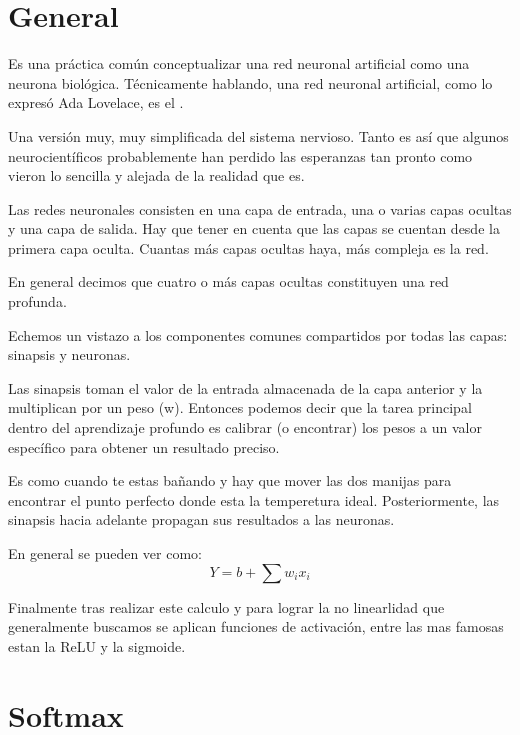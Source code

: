 \documentclass[12pt, fleqn]{report}                             %
\newcommand \Quote              {\qq}                           %
\theoremstyle{break}                                            %
\begin{document}
        \section{General}

        Es una práctica común conceptualizar una red neuronal artificial como una neurona biológica. 
        Técnicamente hablando, una red neuronal artificial, como lo expresó Ada Lovelace, 
        es el \Quote{cálculo del sistema nervioso}. 
        
        Una versión muy, muy simplificada del sistema nervioso. Tanto es así que algunos neurocientíficos 
        probablemente han perdido las esperanzas tan pronto como vieron lo sencilla y alejada de la realidad que es.

        Las redes neuronales consisten en una capa de entrada, una o varias capas ocultas y una capa de salida. 
        Hay que tener en cuenta que las capas se cuentan desde la primera capa oculta. 
        Cuantas más capas ocultas haya, más compleja es la red. 
        
        En general decimos que cuatro o más capas ocultas constituyen una red profunda. 

        Echemos un vistazo a los componentes comunes compartidos por todas las capas: sinapsis y neuronas.

        Las sinapsis toman el valor de la entrada almacenada de la capa anterior y la multiplican por un peso (w). 
        Entonces podemos decir que la tarea principal dentro del aprendizaje profundo es calibrar (o encontrar)
        los pesos a un valor específico para obtener un resultado preciso. 
        
        Es como cuando te estas bañando y hay que mover las dos manijas para encontrar el punto perfecto donde esta
        la temperetura ideal.
        Posteriormente, las sinapsis hacia adelante propagan sus resultados a las neuronas.

        En general se pueden ver como:
        \begin{equation}
            Y = b + \sum{w_i x_i}
        \end{equation}

        Finalmente tras realizar este calculo y para lograr la no linearlidad que generalmente buscamos
        se aplican funciones de activación, entre las mas famosas estan la ReLU y la sigmoide.

        \section{Softmax}
\end{document}
